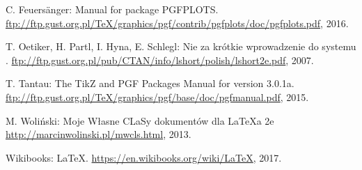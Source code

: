\begin{thebibliography}{99}
C. Feuers\"anger: Manual for package PGFPLOTS. \url{ftp://ftp.gust.org.pl/TeX/graphics/pgf/contrib/pgfplots/doc/pgfplots.pdf}, 2016.

T. Oetiker, H. Partl, I. Hyna, E. Schlegl: Nie za krótkie wprowadzenie do systemu \LaTeXe. \url{ftp://ftp.gust.org.pl/pub/CTAN/info/lshort/polish/lshort2e.pdf}, 2007.

T. Tantau: The TikZ and PGF Packages Manual for version 3.0.1a. \url{ftp://ftp.gust.org.pl/TeX/graphics/pgf/base/doc/pgfmanual.pdf}, 2015.

M. Woliński: Moje Własne CLaSy dokumentów dla \LaTeX a 2e \url{http://marcinwolinski.pl/mwcls.html}, 2013.

Wikibooks: \LaTeX. \url{https://en.wikibooks.org/wiki/LaTeX}, 2017.

\end{thebibliography}